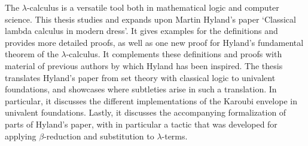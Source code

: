 The $ \lambda $-calculus is a versatile tool both in mathematical logic and computer science. This thesis studies and expands upon Martin Hyland's paper `Classical lambda calculus in modern dress'. It gives examples for the definitions and provides more detailed proofs, as well as one new proof for Hyland's fundamental theorem of the $ \lambda $-calculus. It complements these definitions and proofs with material of previous authors by which Hyland has been inspired.
The thesis translates Hyland's paper from set theory with classical logic to univalent foundations, and showcases where subtleties arise in such a translation. In particular, it discusses the different implementations of the Karoubi envelope in univalent foundations.
Lastly, it discusses the accompanying formalization of parts of Hyland's paper, with in particular a tactic that was developed for applying $ \beta $-reduction and substitution to $ \lambda $-terms.
